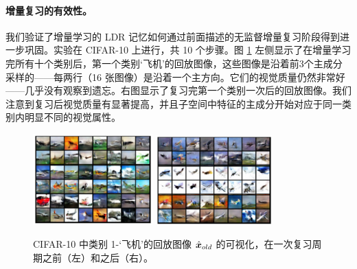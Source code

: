 \documentclass[../../book-main.tex]{subfiles}
\begin{document}


\paragraph{增量复习的有效性。}
我们验证了增量学习的 LDR 记忆如何通过前面描述的无监督增量复习阶段得到进一步巩固。实验在 CIFAR-10 上进行，共 10 个步骤。图 \ref{fig:memory_review} 左侧显示了在增量学习完所有十个类别后，第一个类别‘飞机’的回放图像，这些图像是沿着前3个主成分采样的——每两行（16 张图像）是沿着一个主方向。它们的视觉质量仍然非常好——几乎没有观察到遗忘。右图显示了复习完第一个类别一次后的回放图像。我们注意到复习后视觉质量有显著提高，并且子空间中特征的主成分开始对应于同一类别内明显不同的视觉属性。

\begin{figure}
\centering
\includegraphics[width=0.41\textwidth]{figs_chap6/memory_before_review_clip.png}
\includegraphics[width=0.4\textwidth]{figs_chap6/memory_after_review_clip.png}
 \caption{\small CIFAR-10 中类别 1-‘飞机’的回放图像 $\hat{\bm{x}}_{old}$ 的可视化，在一次复习周期之前（左）和之后（右）。} 
\label{fig:memory_review}
\end{figure}
\end{document}
